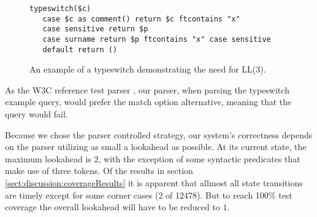 \begin{figure}[h!]
\begin{Verbatim}
typeswitch($c) 
   case $c as comment() return $c ftcontains "x"
   case sensitive return $p
   case surname return $p ftcontains "x" case sensitive
   default return ()
\end{Verbatim}
\label{fig:notLL2}
\caption[A typeswitch shows the need for LL(3)]{An example of a typeswitch demonstrating the need for LL(3).}
\end{figure}

As the W3C reference test parser \cite{parserTestPage}, our parser, when parsing the typeswitch example query, would prefer the match option alternative, meaning that the query would fail.

Because we chose the parser controlled strategy, our system's correctness
depends on the parser utilizing as small a lookahead as possible. At its current state, the maximum lookahead is $2$, with the exception of some syntactic predicates that make use of three tokens. Of the results in section \ref{sect:discussion:coverageResults} it is apparent that allmost all state transitions are timely except for some corner cases (2 of 12478). But to reach 100\% test coverage the overall lookahead will have to be reduced to $1$. 
